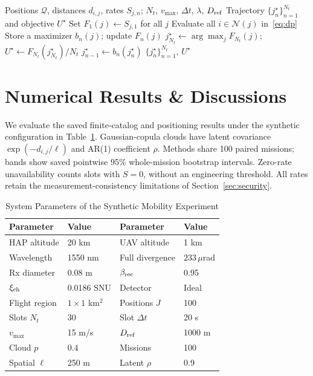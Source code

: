 \documentclass[conference,a4paper]{IEEEtran}
\begin{document}
\begin{algorithm}[t]
\caption{Dynamic Programming for Mobility-Aware UAV Positioning}
\label{alg:dp}
\begin{algorithmic}[1]
\Require Positions $\mathcal Q$, distances $d_{i,j}$, rates $S_{j,n}$;
\Statex \hspace{\algorithmicindent} $N_t$, $v_{\max}$, $\Delta t$, $\lambda$, $D_{\rm ref}$
\Ensure Trajectory $\{j_n^\star\}_{n=1}^{N_t}$ and objective $U^\star$
\State Set $F_1(j)\gets S_{j,1}$ for all $j$
    \State Evaluate all $i\in\mathcal N(j)$ in~\eqref{eq:dp}
    \State Store a maximizer $b_n(j)$; update $F_n(j)$
  \EndFor
\EndFor
\State $j_{N_t}^\star\gets\arg\max_jF_{N_t}(j)$;
\Statex \hspace{\algorithmicindent} $U^\star\gets F_{N_t}(j_{N_t}^\star)/N_t$
  \State $j_{n-1}^\star\gets b_n(j_n^\star)$
\EndFor
\State \Return $\{j_n^\star\}_{n=1}^{N_t}$, $U^\star$
\end{algorithmic}
\end{algorithm}

\section{Numerical Results \& Discussions}
\label{sec:numerical}
\setcounter{figure}{1}
We evaluate the saved finite-catalog and positioning results under the
synthetic configuration in Table~\ref{tab:parameters}. Gaussian-copula
clouds have latent covariance $\exp(-d_{i,j}/\ell)$ and AR(1) coefficient
$\rho$. Methods share 100 paired missions; bands show saved pointwise
95\% whole-mission bootstrap intervals. Zero-rate unavailability counts
slots with $S=0$, without an engineering threshold. All rates retain the
measurement-consistency limitations of Section~\ref{sec:security}.

\begin{table}[t]
\caption{System Parameters of the Synthetic Mobility Experiment}
\label{tab:parameters}
\centering
\footnotesize
\begin{tabular}{@{}llll@{}}
\toprule
Parameter & Value & Parameter & Value\\
\midrule
HAP altitude & 20 km & UAV altitude & 1 km\\
Wavelength & 1550 nm & Full divergence & $233\,\mu$rad\\
Rx diameter & 0.08 m & $\beta_{\rm rec}$ & 0.95\\
$\xi_{\rm ch}$ & 0.0186 SNU & Detector & Ideal\\
Flight region & $1\times1$ km$^2$ & Positions $J$ & 100\\
Slots $N_t$ & 30 & Slot $\Delta t$ & 20 s\\
$v_{\max}$ & 15 m/s & $D_{\rm ref}$ & 1000 m\\
Cloud $p$ & 0.4 & Missions & 100\\
Spatial $\ell$ & 250 m & Latent $\rho$ & 0.9\\
\bottomrule
\end{tabular}
\end{table}
\end{document}
